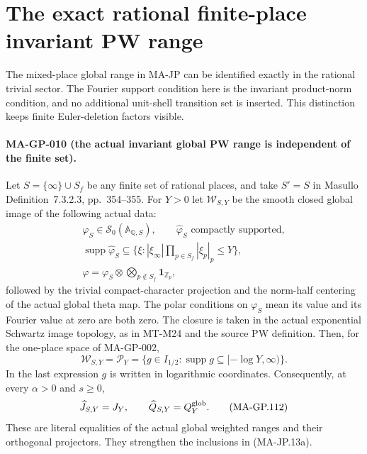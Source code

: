 \section{The exact rational finite-place invariant PW range}
\label{sec:rational-mixed-pw}

The mixed-place global range in MA-JP can be identified exactly
in the rational trivial sector.  The Fourier support condition
here is the invariant product-norm condition, and no additional
unit-shell transition set is inserted.  This distinction keeps
finite Euler-deletion factors visible.

\paragraph{MA-GP-010 (the actual invariant global PW range is independent of the finite set).}
Let $S=\{\infty\}\cup S_f$ be any finite set of rational
places, and take $S'=S$ in Masullo Definition~7.3.2.3,
pp.~354--355.  For $Y>0$ let $\mathscr W_{S,Y}$ be the
smooth closed global image of the following actual data:
\[
 \begin{gathered}
 \varphi_S\in\mathcal S_0(\mathbb A_{\mathbb Q,S}),\qquad
 \widehat\varphi_S\text{ compactly supported},\\
 \operatorname{supp}\widehat\varphi_S
       \subseteq\{\xi:|\xi_\infty|\prod_{p\in S_f}|\xi_p|_p\le Y\},\\
 \varphi=\varphi_S\otimes
                  \bigotimes_{p\notin S_f}\mathbf1_{\mathbb Z_p},
 \end{gathered}
 \tag{MA-GP.110}
\]
followed by the trivial compact-character projection and the
norm-half centering of the actual global theta map.
The polar conditions on $\varphi_S$ mean its value and its
Fourier value at zero are both zero.
The closure is taken in the actual exponential Schwartz
image topology, as in MT-M24 and the source PW definition.
Then, for the one-place space of MA-GP-002,
\[
                    \mathscr W_{S,Y}=\mathscr P_Y
      =\{g\in I_{1/2}:\operatorname{supp}g
                                      \subseteq[-\log Y,\infty)\}.
 \tag{MA-GP.111}
\]
In the last expression $g$ is written in logarithmic
coordinates.  Consequently, at every $\alpha>0$ and $s\ge0$,
\[
            \widehat J_{S,Y}=J_Y,\qquad
            \widehat Q_{S,Y}=Q_Y^{\rm glob}.
 \tag{MA-GP.112}
\]
These are literal equalities of the actual global weighted
ranges and their orthogonal projectors.  They strengthen the
inclusions in (MA-JP.13a).


